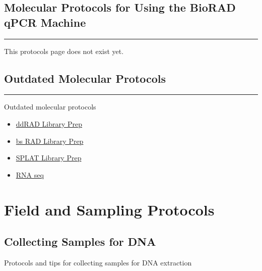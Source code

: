 \documentclass[
  letterpaper,
  DIV=11,
  numbers=noendperiod]{scrreprt}
\begin{document}
\hypertarget{molecular-protocols-for-using-the-biorad-qpcr-machine}{%
\chapter{Molecular Protocols for Using the BioRAD qPCR
Machine}\label{molecular-protocols-for-using-the-biorad-qpcr-machine}}

\begin{center}\rule{0.5\linewidth}{0.5pt}\end{center}

This protocols page does not exist yet.

\hypertarget{outdated-molecular-protocols}{%
\chapter{Outdated Molecular
Protocols}\label{outdated-molecular-protocols}}

\begin{center}\rule{0.5\linewidth}{0.5pt}\end{center}

Outdated molecular protocols

\begin{itemize}
\item
  \href{https://drk-lo.github.io/lotterhoslabprotocols/molecprot_ddradlibprep/}{ddRAD
  Library Prep}
\item
  \href{https://drk-lo.github.io/lotterhoslabprotocols/molecprot_bsddradlibprep/}{bs
  RAD Library Prep}
\item
  \href{https://drk-lo.github.io/lotterhoslabprotocols/molecprot_splatlibraryprep/}{SPLAT
  Library Prep}
\item
  \href{https://drk-lo.github.io/lotterhoslabprotocols/molecprot_rnaseqlibraryprep/}{RNA
  seq}\\
\end{itemize}

\part{Field and Sampling Protocols}

\hypertarget{collecting-samples-for-dna}{%
\chapter{Collecting Samples for DNA}\label{collecting-samples-for-dna}}

Protocols and tips for collecting samples for DNA extraction
\end{document}
